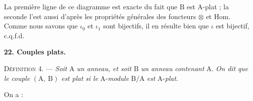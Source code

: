 \begin{center}
\end{center}
La première ligne de ce diagramme est exacte du fait que $\mathrm{B}$ est $\mathrm{A}$-plat ; la seconde l'est aussi d'après les propriétés générales des foncteurs $\otimes$ et Hom. Comme nous savons que $\iota_0$ et $\iota_1$ sont bijectifs, il en résulte bien que $\iota$ est bijectif, c.q.f.d.


\textbf{22. Couples plats.}

\textsc{Définition} 4. --- \textit{Soit} $\mathrm{A}$ \textit{un anneau, et soit} $\mathrm{B}$ \textit{un anneau contenant} $\mathrm{A}$. \textit{On dit que le couple} $(\mathrm{A},\ \mathrm{B})$ \textit{est plat si le} $\mathrm{A}$-\textit{module} $\mathrm{B}/\mathrm{A}$ \textit{est} $\mathrm{A}$-\textit{plat.}

On a :

